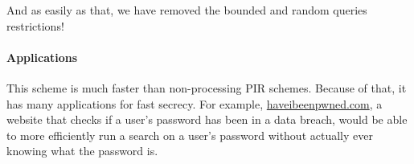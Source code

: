 And as easily as that, we have removed the bounded and random queries restrictions!

\paragraph{Applications}
This scheme is much faster than non-processing PIR schemes. Because of that, it has many applications for fast secrecy. For example, \href{https://haveibeenpwned.com/}{haveibeenpwned.com}, a website that checks if a user's password has been in a data breach, would be able to more efficiently run a search on a user's password without actually ever knowing what the password is.
